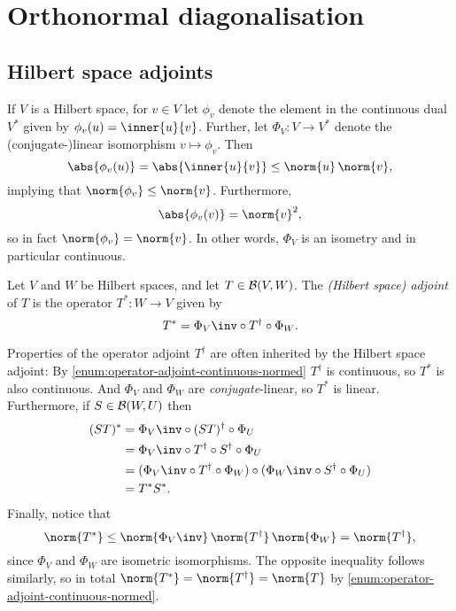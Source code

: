 \documentclass[article, a4paper, 11pt, oneside]{memoir}
\numberwithin{equation}{chapter}
\begin{document}
\chapter{Orthonormal diagonalisation}

\section{Hilbert space adjoints}

If $V$ is a Hilbert space, for $v \in V$ let $\phi_v$ denote the element in the continuous dual $V^*$ given by $\phi_v(u) = \inner{u}{v}$. Further, let $\Phi_V \colon V \to V^*$ denote the (conjugate-)linear isomorphism $v \mapsto \phi_v$. Then
%
\begin{equation*}
    \abs{\phi_v(u)}
        = \abs{\inner{u}{v}}
        \leq \norm{u} \, \norm{v},
\end{equation*}
%
implying that $\norm{\phi_v} \leq \norm{v}$. Furthermore,
%
\begin{equation*}
    \abs{\phi_v(v)}
        = \norm{v}^2,
\end{equation*}
%
so in fact $\norm{\phi_v} = \norm{v}$. In other words, $\Phi_V$ is an isometry and in particular continuous.

\begin{definition}
    Let $V$ and $W$ be Hilbert spaces, and let $T \in \mathcal{B}(V,W)$. The \emph{(Hilbert space) adjoint} of $T$ is the operator $T^* \colon W \to V$ given by
    \begin{equation*}
        T^*
            = \Phi_V\inv \circ T^\dagger \circ \Phi_W.
    \end{equation*}
\end{definition}
%
Properties of the operator adjoint $T^\dagger$ are often inherited by the Hilbert space adjoint: By \cref{enum:operator-adjoint-continuous-normed} $T^\dagger$ is continuous, so $T^*$ is also continuous. And $\Phi_V$ and $\Phi_W$ are \emph{conjugate}-linear, so $T^*$ is linear. Furthermore, if $S \in \mathcal{B}(W,U)$ then
%
\begin{align*}
    (ST)^*
        &= \Phi_V\inv \circ (ST)^\dagger \circ \Phi_U \\
        &= \Phi_V\inv \circ T^\dagger \circ S^\dagger \circ \Phi_U \\
        &= (\Phi_V\inv \circ T^\dagger \circ \Phi_W) \circ (\Phi_W\inv \circ S^\dagger \circ \Phi_U) \\
        &= T^* S^*.
\end{align*}
%
Finally, notice that
%
\begin{equation*}
    \norm{T^*}
        \leq \norm{\Phi_V\inv} \, \norm{T^\dagger} \, \norm{\Phi_W}
        = \norm{T^\dagger},
\end{equation*}
%
since $\Phi_V$ and $\Phi_W$ are isometric isomorphisms. The opposite inequality follows similarly, so in total $\norm{T^*} = \norm{T^\dagger} = \norm{T}$ by \cref{enum:operator-adjoint-continuous-normed}.
\end{document}
